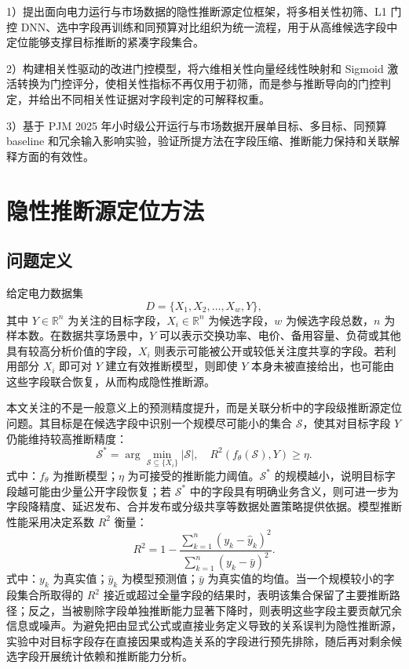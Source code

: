 \documentclass[UTF8,zihao=5,twoside]{ctexart}
\numberwithin{equation}{section}
\begin{document}
1）提出面向电力运行与市场数据的隐性推断源定位框架，将多相关性初筛、L1 门控 DNN、选中字段再训练和同预算对比组织为统一流程，用于从高维候选字段中定位能够支撑目标推断的紧凑字段集合。

2）构建相关性驱动的改进门控模型，将六维相关性向量经线性映射和 Sigmoid 激活转换为门控评分，使相关性指标不再仅用于初筛，而是参与推断导向的门控判定，并给出不同相关性证据对字段判定的可解释权重。

3）基于 PJM 2025 年小时级公开运行与市场数据开展单目标、多目标、同预算 baseline 和冗余输入影响实验，验证所提方法在字段压缩、推断能力保持和关联解释方面的有效性。

\section{隐性推断源定位方法}
\subsection{问题定义}
给定电力数据集
\begin{equation}
D=\{X_1,X_2,\ldots,X_w,Y\},
\end{equation}
其中 $Y\in\mathbb{R}^{n}$ 为关注的目标字段，$X_i\in\mathbb{R}^{n}$ 为候选字段，$w$ 为候选字段总数，$n$ 为样本数。在数据共享场景中，$Y$ 可以表示交换功率、电价、备用容量、负荷或其他具有较高分析价值的字段，$X_i$ 则表示可能被公开或较低关注度共享的字段。若利用部分 $X_i$ 即可对 $Y$ 建立有效推断模型，则即使 $Y$ 本身未被直接给出，也可能由这些字段联合恢复，从而构成隐性推断源。

本文关注的不是一般意义上的预测精度提升，而是关联分析中的字段级推断源定位问题。其目标是在候选字段中识别一个规模尽可能小的集合 $\mathcal{S}$，使其对目标字段 $Y$ 仍能维持较高推断精度：
\begin{equation}
\mathcal{S}^{*}=\arg\min_{\mathcal{S}\subseteq \{X_i\}}\left|\mathcal{S}\right|,
\quad
R^2(f_{\theta}(\mathcal{S}),Y)\geq \eta .
\end{equation}
式中：$f_{\theta}$ 为推断模型；$\eta$ 为可接受的推断能力阈值。$\mathcal{S}^{*}$ 的规模越小，说明目标字段越可能由少量公开字段恢复；若 $\mathcal{S}^{*}$ 中的字段具有明确业务含义，则可进一步为字段降精度、延迟发布、合并发布或分级共享等数据处置策略提供依据。模型推断性能采用决定系数 $R^2$ 衡量：
\begin{equation}
R^2=1-\frac{\sum_{k=1}^{n}(y_k-\hat{y}_k)^2}{\sum_{k=1}^{n}(y_k-\bar{y})^2}.
\end{equation}
式中：$y_k$ 为真实值；$\hat{y}_k$ 为模型预测值；$\bar{y}$ 为真实值的均值。当一个规模较小的字段集合所取得的 $R^2$ 接近或超过全量字段的结果时，表明该集合保留了主要推断路径；反之，当被剔除字段单独推断能力显著下降时，则表明这些字段主要贡献冗余信息或噪声。为避免把由显式公式或直接业务定义导致的关系误判为隐性推断源，实验中对目标字段存在直接因果或构造关系的字段进行预先排除，随后再对剩余候选字段开展统计依赖和推断能力分析。
\end{document}
